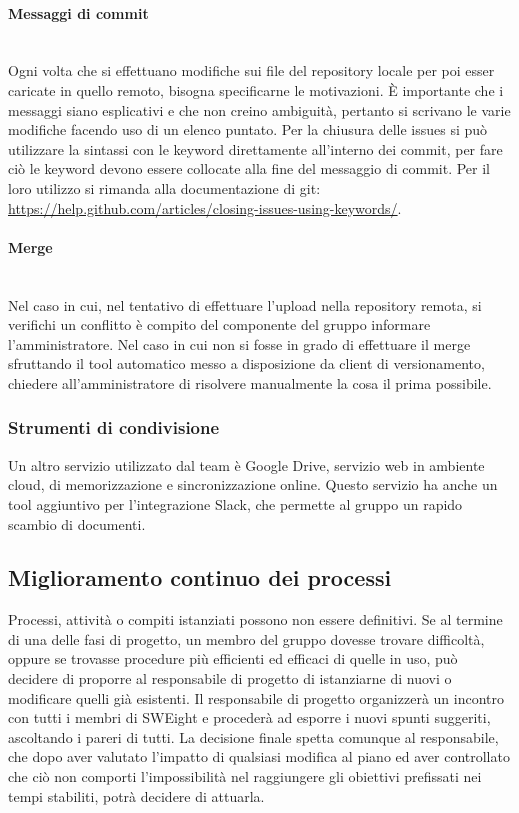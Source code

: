 \paragraph{Messaggi di commit}\mbox{}\\
Ogni volta che si effettuano modifiche sui file del {repository} locale per poi esser caricate in
quello remoto, bisogna specificarne le motivazioni. \uppercase{è} importante che i messaggi siano esplicativi e che non creino ambiguità, pertanto si scrivano le varie modifiche facendo uso di un elenco puntato.
Per la chiusura delle issues si può utilizzare la sintassi con le {keyword} direttamente all'interno dei {commit}, per fare ciò le keyword devono essere collocate alla fine del messaggio di commit. Per il loro utilizzo si rimanda alla documentazione di {git}: \url{https://help.github.com/articles/closing-issues-using-keywords/}. 

\paragraph{Merge}\mbox{}\\
Nel caso in cui, nel tentativo di effettuare l'upload nella repository remota, si verifichi un {conflitto} è compito del componente del gruppo informare l'amministratore. Nel caso in cui non si fosse in grado di effettuare il {merge} sfruttando il tool automatico messo a disposizione da client di versionamento, chiedere all'amministratore di risolvere manualmente la cosa il prima possibile.


\subsubsection{Strumenti di condivisione}
Un altro servizio utilizzato dal team è Google Drive, servizio web in {ambiente cloud}, di memorizzazione e sincronizzazione online. Questo servizio ha anche un tool aggiuntivo per l'integrazione {Slack}, che permette al gruppo un rapido scambio di documenti.
\subsection{Miglioramento continuo dei processi}
Processi, attività o compiti istanziati possono non essere definitivi. Se al termine di una delle fasi di progetto, un membro del gruppo dovesse trovare difficoltà, oppure se trovasse procedure più efficienti ed efficaci di quelle in uso, può decidere di proporre al responsabile di progetto di istanziarne di nuovi o modificare quelli già esistenti.  
\newline
Il responsabile di progetto organizzerà un incontro con tutti i membri di SWEight e procederà ad esporre i nuovi spunti suggeriti, ascoltando i pareri di tutti. 
\newline
La decisione finale spetta comunque al responsabile, che dopo aver valutato l'impatto di qualsiasi modifica al piano ed aver controllato che ciò non comporti l'impossibilità nel raggiungere gli obiettivi prefissati nei tempi stabiliti, potrà decidere di attuarla.

